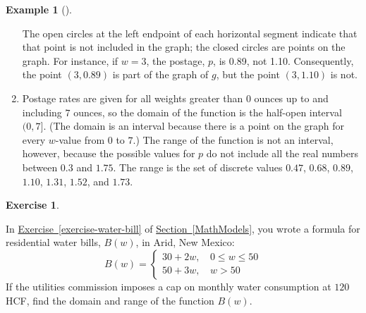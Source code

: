\documentclass[10pt,]{book}
\theoremstyle{plain}
\theoremstyle{definition}
\theoremstyle{definition}
\theoremstyle{definition}
\newtheorem{example}[theorem]{Example}
\theoremstyle{definition}
\theoremstyle{definition}
\newtheorem{exercise}[theorem]{Exercise}
\numberwithin{equation}{section}
\newcommand{\gt}{ > }
\newcommand{\amp}{ & }
\begin{document}
\begin{example}[]
\begin{enumerate}[label=*\alph**]
\begin{figure}
\end{figure}

    The open circles at the left endpoint of each horizontal segment indicate that that point is not included in the graph; the closed circles are points on the graph. For instance, if \(w = 3\), the postage, \(p\), is \textdollar{}0.89, not \textdollar{}1.10. Consequently, the point \((3, 0.89)\) is part of the graph of \(g\), but the point \((3, 1.10)\) is not.
    \item\hypertarget{li-384}{}Postage rates are given for all weights greater than \(0\) ounces up to and including \(7\) ounces, so the domain of the function is the half-open interval \((0, 7]\). (The domain is an interval because there is a point on the graph for every \(w\)-value from \(0\) to \(7\).) The range of the function is not an interval, however, because the possible values for \(p\) do not include all the real numbers between \(0.3\) and \(1.75\). The range is the set of discrete values \(0.47\), \(0.68\), \(0.89\), \(1.10\), \(1.31\), \(1.52\), and \(1.73\).\end{enumerate}
\end{example}
\begin{exercise}\label{exercise-piecewise-domain-and-range}

    In \hyperref[exercise-water-bill]{Exercise~\ref{exercise-water-bill}} of \hyperref[MathModels]{Section~\ref{MathModels}}, you wrote a formula for residential water bills, \(B(w)\), in Arid, New Mexico:
    \begin{equation*}
    B(w) =
    \begin{cases}
    30 + 2w\text{, } \amp   0 \le w \le 50\\
    50 + 3w\text{, } \amp  w\gt 50
    \end{cases}
    \end{equation*}
    If the utilities commission imposes a cap on monthly water consumption at \(120\) HCF, find the domain and range of the function \(B(w)\).
\end{exercise}
\typeout{************************************************}
\typeout{************************************************}
\end{document}
